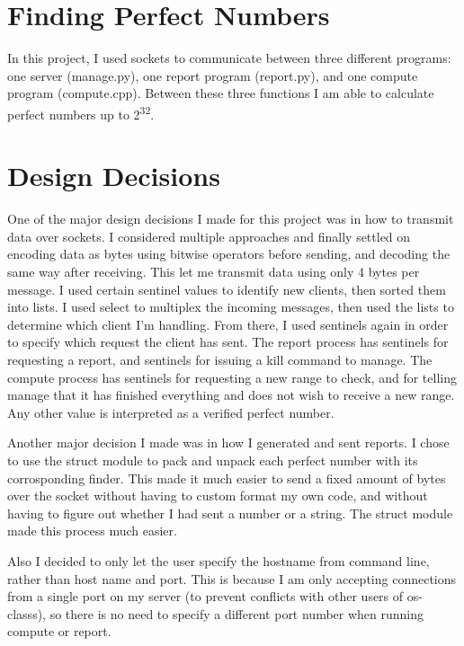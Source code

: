 \documentclass[letterpaper,10pt,twocolumn,titlepage]{article}
\begin{document}


\section{Finding Perfect Numbers}
In this project, I used sockets to communicate between three different programs: 
one server (manage.py), one report program (report.py), and one compute program 
(compute.cpp). Between these three functions I am able to calculate perfect numbers
up to 2\textsuperscript{32}.

\section{Design Decisions}
One of the major design decisions I made for this project was in how to transmit data
over sockets. I considered multiple approaches and finally settled on encoding data
as bytes using bitwise operators before sending, and decoding the same way after receiving.
This let me transmit data using only 4 bytes per message. I used certain sentinel values
to identify new clients, then sorted them into lists. I used select to multiplex the incoming
messages, then used the lists to determine which client I'm handling. From there, I used
sentinels again in order to specify which request the client has sent. The report process
has sentinels for requesting a report, and sentinels for issuing a kill command to manage.
The compute process has sentinels for requesting a new range to check, and for telling manage
that it has finished everything and does not wish to receive a new range. Any other value is 
interpreted as a verified perfect number.

Another major decision I made was in how I generated and sent reports. I chose to use
the struct module to pack and unpack each perfect number with its corrosponding finder.
This made it much easier to send a fixed amount of bytes over the socket without having
to custom format my own code, and without having to figure out whether I had sent a number
or a string. The struct module made this process much easier.

Also I decided to only let the user specify the hostname from command line, rather
than host name and port. This is because I am only accepting connections from a single
port on my server (to prevent conflicts with other users of os-classs), so there is no
need to specify a different port number when running compute or report.
\end{document}

